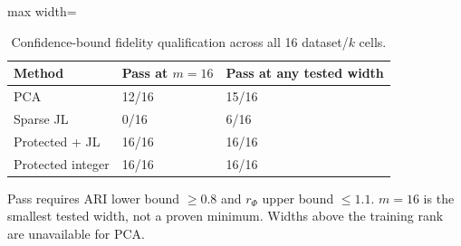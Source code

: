 \begin{table}[tp]
\caption{Confidence-bound fidelity qualification across all 16 dataset/$k$ cells.}\label{tab:eligibility}
\centering\scriptsize
\begin{adjustbox}{max width=\textwidth}
\begin{tabular}{@{}lll@{}}
\toprule
Method & Pass at $m=16$ & Pass at any tested width \\
\midrule
PCA & 12/16 & 15/16 \\
Sparse JL & 0/16 & 6/16 \\
Protected + JL & 16/16 & 16/16 \\
Protected integer & 16/16 & 16/16 \\
\bottomrule
\end{tabular}
\end{adjustbox}
\par\smallskip
\begin{minipage}{\textwidth}\scriptsize Pass requires ARI lower bound $\geq0.8$ and $r_\Phi$ upper bound $\leq1.1$. $m=16$ is the smallest tested width, not a proven minimum. Widths above the training rank are unavailable for PCA.\end{minipage}
\end{table}
